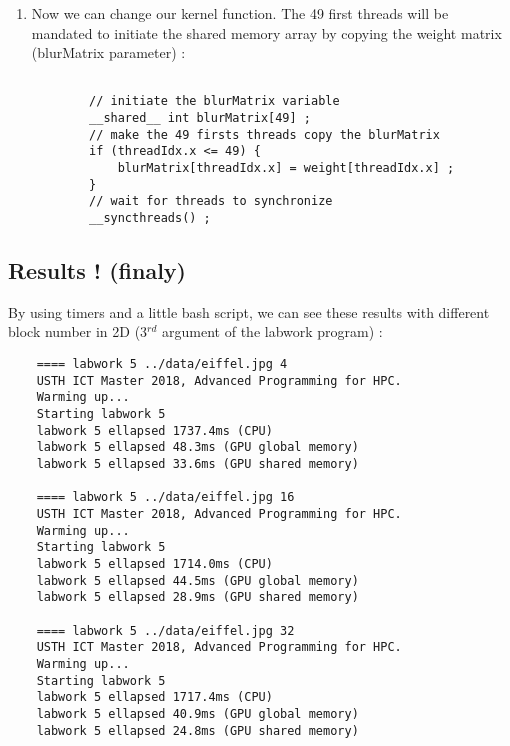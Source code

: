 \documentclass{article}
\begin{document}
\begin{enumerate}
    \item 
    Now we can change our kernel function. The 49 first threads will be mandated to initiate the shared memory array by copying the weight matrix (blurMatrix parameter) : 
    \begin{verbatim}
        
        // initiate the blurMatrix variable 
        __shared__ int blurMatrix[49] ;
        // make the 49 firsts threads copy the blurMatrix
        if (threadIdx.x <= 49) {
            blurMatrix[threadIdx.x] = weight[threadIdx.x] ;
        }
        // wait for threads to synchronize
        __syncthreads() ;
    \end{verbatim}
    \end{enumerate}
\subsection{Results ! (finaly)}
By using timers and a little bash script, we can see these results with different block number in 2D (3$^{rd}$ argument of the labwork program) :
    \begin{verbatim}
    ==== labwork 5 ../data/eiffel.jpg 4 
    USTH ICT Master 2018, Advanced Programming for HPC.
    Warming up...
    Starting labwork 5
    labwork 5 ellapsed 1737.4ms (CPU)
    labwork 5 ellapsed 48.3ms (GPU global memory)
    labwork 5 ellapsed 33.6ms (GPU shared memory)
    
    ==== labwork 5 ../data/eiffel.jpg 16
    USTH ICT Master 2018, Advanced Programming for HPC.
    Warming up...
    Starting labwork 5
    labwork 5 ellapsed 1714.0ms (CPU)
    labwork 5 ellapsed 44.5ms (GPU global memory)
    labwork 5 ellapsed 28.9ms (GPU shared memory)
    
    ==== labwork 5 ../data/eiffel.jpg 32
    USTH ICT Master 2018, Advanced Programming for HPC.
    Warming up...
    Starting labwork 5
    labwork 5 ellapsed 1717.4ms (CPU)
    labwork 5 ellapsed 40.9ms (GPU global memory)
    labwork 5 ellapsed 24.8ms (GPU shared memory)



    \end{verbatim}
\end{document}
